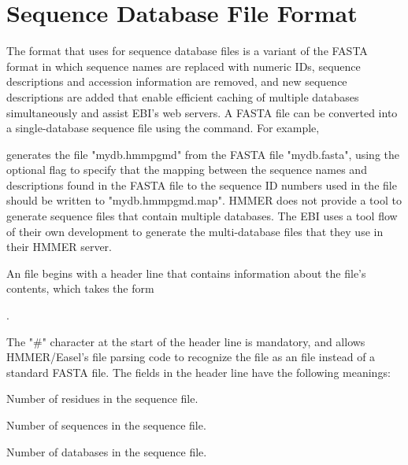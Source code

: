 \documentclass[notoc,justified]{tufte-book}    %
\begin{document}
{\section{Sequence Database File Format}
The  format that  uses for sequence database files is a variant of the FASTA format in which sequence names are replaced with numeric IDs, sequence descriptions and accession information are removed, and new sequence descriptions are added that enable efficient caching of multiple databases simultaneously and assist EBI's web servers.  
A FASTA file can be converted into a single-database  sequence file using the  command.  For example, 


generates the  file "mydb.hmmpgmd" from the FASTA file "mydb.fasta", using the optional  flag to specify that the mapping between the sequence names and descriptions found in the FASTA file to the sequence ID numbers used in the  file should be written to "mydb.hmmpgmd.map".  HMMER does not provide a tool to generate sequence files that contain multiple databases.  The EBI uses a tool flow of their own development to generate the multi-database files that they use in their HMMER server.
 

An  file begins with a header line that contains information about the file's contents, which takes the form 

.

The "\#" character at the start of the header line is mandatory, and allows HMMER/Easel's file parsing code to recognize the file as an  file instead of a standard FASTA file.  The fields in the header line have the following meanings:

\begin{sreitems}{}

\item [\monob{res\_cnt}] Number of residues in the sequence file.

\item [\monob{seq\_cnt}] Number of sequences in the sequence file. 

\item [\monob{db\_cnt}] Number of databases in the sequence file. 


\end{sreitems}}
\end{document}

